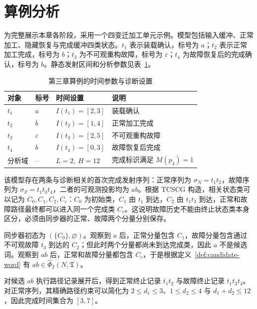 \documentclass[master,fontset=ubuntu]{shnuthesis}
\theoremstyle{definition}
\begin{document}
\section{算例分析}

为完整展示本章各阶段，采用一个四变迁加工单元示例。模型包括输入缓冲、正常加工、隐藏恢复与完成缓冲四类状态。\(t_1\) 表示装载确认，标号为 \(a\)；\(t_2\) 表示正常加工完成，标号为 \(b\)；\(t_3\) 为不可观重构故障，标号为 \(\varepsilon\)；\(t_4\) 为故障恢复后的完成确认，标号为 \(b\)。静态发射区间和分析参数见表~\ref{tab:chap3-example}。

\begin{table}[htbp]
\centering
\small
\caption{第三章算例的时间参数与诊断设置}
\label{tab:chap3-example}
\renewcommand{\arraystretch}{1.18}
\begin{tabularx}{\textwidth}{>{\centering\arraybackslash}p{2.5cm}>{\centering\arraybackslash}p{2cm}>{\centering\arraybackslash}p{4.0cm}>{\raggedright\arraybackslash}X}
\hline
对象 & 标号 & 时间设置 & 说明\\
\hline
\(t_1\) & \(a\) & \(I(t_1)=[2,3]\) & 装载确认\\
\(t_2\) & \(b\) & \(I(t_2)=[1,4]\) & 正常加工完成\\
\(t_3\) & \(\varepsilon\) & \(I(t_3)=[2,5]\) & 不可观重构故障\\
\(t_4\) & \(b\) & \(I(t_4)=[0,3]\) & 故障恢复后完成\\
分析域 & -- & \(L=2,\ H=12\) & 完成标识满足 \(M(p_4)=1\)\\
\hline
\end{tabularx}
\end{table}

该模型存在两条与诊断相关的首次完成发射序列：正常序列为 \(\sigma_N=t_1t_2\)，故障序列为 \(\sigma_F=t_1t_3t_4\)，二者的可观测投影均为 \(ab\)。根据 TCSCG 构造，相关状态类可以记为 \(C_0,C_1,C_2,C_c\)：\(C_0\) 为初始类，\(C_1\) 由 \(t_1\) 到达，\(C_2\) 由 \(t_1t_3\) 到达，正常和故障路径最终都可以进入同一个完成类 \(C_c\)。这说明故障历史不能由终止状态类本身区分，必须由同步器的正常、故障两个分量分别保存。

同步器初态为 \((\{C_0\},\varnothing)\)。观察到 \(a\) 后，正常分量包含 \(C_1\)，故障分量包含通过不可观故障 \(t_3\) 到达的 \(C_2\)；但此时两个分量都尚未到达完成类，因此 \(a\) 不是候选词。观察到 \(ab\) 后，正常和故障分量都包含 \(C_c\)，于是根据定义~\ref{def:candidate-word} 有 \(ab\in\widehat\Phi_2(N,\mathfrak T)\)。

对候选 \(ab\) 执行路径记录展开后，得到正常终止记录 \(t_1t_2\) 与故障终止记录 \(t_1t_3t_4\)。对正常序列，其精确路径约束可以简化为 \(2\leq d_1\leq3\)、\(1\leq d_2\leq4\) 与 \(d_1+d_2\leq12\)，因此完成时间集合为 \([3,7]\)。
\end{document}
